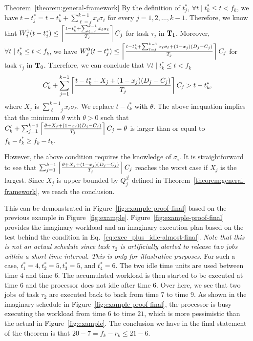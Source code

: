 \begin{appProof}{Theorem~\ref{theorem:general-framework}}
By the definition of $t_j^*$, $\forall t \mid t_k^* \leq t < f_k$, we have
$t-t_j^* = t - t_k^* + \sum_{\ell=j}^{k-1} x_\ell\sigma_\ell$ for every
$j=1,2,\ldots,k-1$. Therefore, we know that
 $W_j^1(t-t_j^*) \leq
\left\lceil{\frac{t-t_k^* +\sum_{\ell=j}^{k-1} x_\ell\sigma_\ell}{T_j}}\right\rceil C_j$ for task $\tau_j$ in ${\bf T}_1$. Moreover, 
$\forall t
\mid t_k^* \leq t < f_k$, we have $W_j^0(t-t_j^*) \leq
\left\lceil{\frac{t-t_k^*+\sum_{\ell=j}^{k-1} x_\ell\sigma_\ell + (1-x_j)(D_j-C_j)}{T_j}}\right\rceil C_j$
for task $\tau_j$ in ${\bf T}_0$. Therefore, we can conclude that 
$\forall t \mid t_k^* \leq t < f_k$
\begin{equation}
C_k'+\sum_{j=1}^{k-1} \left\lceil{\frac{t-t_k^*+X_j+(1-x_j)(D_j-C_j)}{T_j}}\right\rceil C_j > t-t_k^*,
\end{equation}
where $X_j$ is $\sum_{\ell=j}^{k-1} x_\ell\sigma_\ell$. We replace $t-t_k^*$ with $\theta$. 
The above inequation implies that the minimum $\theta$ with $\theta > 0$ such that
$C_k'+\sum_{j=1}^{k-1} \left\lceil{\frac{\theta+X_j+(1-x_j)(D_j-C_j)}{T_j}}\right\rceil C_j = \theta$
 is larger than or equal to $f_k-t_k^* \geq f_k-t_k$. 

However, the above condition requires the knowledge of $\sigma_i$. It is straightforward to see that $\sum_{j=1}^{k-1} \left\lceil{\frac{\theta+X_j+(1-x_j)(D_j-C_j)}{T_j}}\right\rceil C_j$ reaches the worst case if $X_j$ is the largest. Since $X_j$ is upper bounded by $Q_j^{\vec{x}}$ defined in Theorem~\ref{theorem:general-framework}, we reach the conclusion.

\begin{example}
This can
be demonstrated in Figure~\ref{fig:example-proof-final} based on the
previous example in
Figure~\ref{fig:example}. Figure~\ref{fig:example-proof-final}
provides the imaginary workload and an imaginary execution plan based
on the test behind the condition in
Eq.~\eqref{eq:exec_plus_idle-almost-final}. \emph{Note that this is
  not an actual schedule since task $\tau_2$ is artificially alerted
  to release two jobs within a short time interval. This is only for
  illustrative purposes.}
For such a case, $t_1^*=4,
t_2^*=5, t_3^*=5$, and $t_4^*=6$. The two idle time units are used
between time $4$ and time $6$. The accumulated workload is then
started to be executed at time $6$ and the processor does not
idle after time $6$. Over here, we see that two jobs of task $\tau_2$ are executed
back to back from time 7 to time 9. As
shown in the imaginary schedule in
Figure~\ref{fig:example-proof-final}, the processor is busy executing
the workload from time $6$ to time $21$, which is more pessimistic
than the actual in Figure~\ref{fig:example}. The conclusion we have in the final statement of the theorem is that $20-7=f_k-r_k \leq 21-6$.
\end{example}

\end{appProof}


